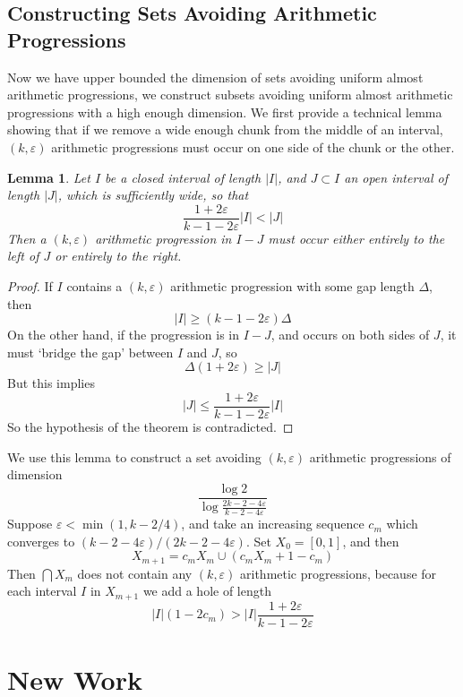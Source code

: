 \documentclass{article}
\theoremstyle{plain}
\newtheorem{lemma}{Lemma}
\theoremstyle{plain}
\begin{document}
\subsection{Constructing Sets Avoiding Arithmetic Progressions}

Now we have upper bounded the dimension of sets avoiding uniform almost arithmetic progressions, we construct subsets avoiding uniform almost arithmetic progressions with a high enough dimension. We first provide a technical lemma showing that if we remove a wide enough chunk from the middle of an interval, $(k,\varepsilon)$ arithmetic progressions must occur on one side of the chunk or the other.

\begin{lemma}
    Let $I$ be a closed interval of length $|I|$, and $J \subset I$ an open interval of length $|J|$, which is sufficiently wide, so that
    \[ \frac{1 + 2 \varepsilon}{k - 1 - 2\varepsilon} |I| < |J| \]
    Then a $(k,\varepsilon)$ arithmetic progression in $I - J$ must occur either entirely to the left of $J$ or entirely to the right.
\end{lemma}
\begin{proof}
    If $I$ contains a $(k,\varepsilon)$ arithmetic progression with some gap length $\Delta$, then
    \[ |I| \geq (k - 1 - 2\varepsilon) \Delta \]
    On the other hand, if the progression is in $I - J$, and occurs on both sides of $J$, it must `bridge the gap' between $I$ and $J$, so
    \[ \Delta (1 + 2\varepsilon) \geq |J| \]
    But this implies
    \[ |J| \leq \frac{1 + 2 \varepsilon}{k - 1 - 2 \varepsilon} |I| \]
    So the hypothesis of the theorem is contradicted.
\end{proof}

We use this lemma to construct a set avoiding $(k,\varepsilon)$ arithmetic progressions of dimension
%
\[ \frac{\log 2}{\log \frac{2k - 2 - 4\varepsilon}{k - 2 - 4\varepsilon}} \]
%
Suppose $\varepsilon < \min(1, k-2/4)$, and take an increasing sequence $c_m$ which converges to $(k-2-4\varepsilon)/(2k - 2 - 4\varepsilon)$. Set $X_0 = [0,1]$, and then
%
\[ X_{m+1} = c_m X_m \cup (c_m X_m + 1 - c_m) \]
%
Then $\bigcap X_m$ does not contain any $(k,\varepsilon)$ arithmetic progressions, because for each interval $I$ in $X_{m+1}$ we add a hole of length
%
\[ |I|(1 - 2c_m) > |I| \frac{1 + 2 \varepsilon}{k - 1 - 2 \varepsilon} \]

\section{New Work}
\end{document}
